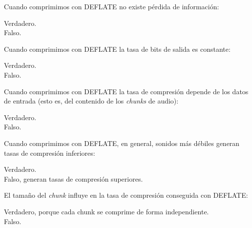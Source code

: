 \documentclass[legalpaper, 12pt, addpoints]{exam}
\begin{document}
\begin{questions}
\vspace{0.10in}

\question Cuando comprimimos con DEFLATE no existe pérdida de información:

\begin{oneparchoices}
  \choice Verdadero.\\
  \choice Falso.
\end{oneparchoices}
  
\vspace{0.10in}

\question Cuando comprimimos con DEFLATE la tasa de bits de salida es constante:

\begin{oneparchoices}
  \choice Verdadero.\\
  \choice Falso.
\end{oneparchoices}
  
\vspace{0.10in}

\question Cuando comprimimos con DEFLATE la tasa de compresión depende
de los datos de entrada (esto es, del contenido de los \emph{chunks} de
audio):

\begin{oneparchoices}
  \choice Verdadero.\\
  \choice Falso.
\end{oneparchoices}
  
\vspace{0.10in}

\question Cuando comprimimos con DEFLATE, en general, sonidos más débiles generan tasas de compresión inferiores:

\begin{oneparchoices}
  \choice Verdadero.\\
  \choice Falso, generan tasas de compresión superiores.
\end{oneparchoices}
  
\vspace{0.10in}

\question El tamaño del \emph{chunk} influye en la tasa de compresión conseguida con DEFLATE:

\begin{oneparchoices}
  \choice Verdadero, porque cada chunk se comprime de forma independiente.\\
  \choice Falso.
\end{oneparchoices}
  
\vspace{0.10in}


\end{questions}
\end{document}
